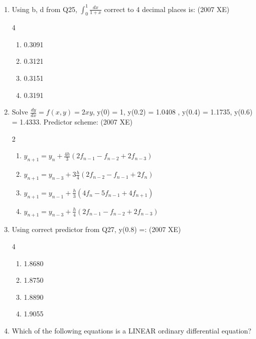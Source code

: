 \begin{enumerate}[label=\thesubsection.\arabic*,ref=\thesubsection.\theenumi]
    \item Using b, d  from Q25, $\int_0^1 \frac{dx}{1+x}$ correct to 4 decimal places is:
    \hfill{(2007 XE)}
    \begin{multicols}{4}
    \begin{enumerate}
        \item 0.3091
        \item 0.3121
        \item 0.3151
        \item 0.3191
    \end{enumerate}
\end{multicols}


    \item Solve $\frac{dy}{dx} = f(x,y) = 2xy$, y(0) = 1, y(0.2) = 1.0408 , y(0.4) = 1.1735, y(0.6) = 1.4333. Predictor scheme:
    \hfill{(2007 XE)}
    \begin{multicols}{2}
    \begin{enumerate}
        \item $y_{n+1} = y_n + \frac{4h}{3} (2f_{n-1} - f_{n-2} + 2f_{n-3})$\\
     
        \item $y_{n+1} = y_{n-3} + 3\frac{h}{4} (2f_{n-2} - f_{n-1} + 2f_n)$\\
      
        \item $y_{n+1} = y_{n-1} + \frac{h}{3} (4f_n - 5f_{n-1} + 4f_{n+1}) $\\
        
        \item $y_{n+1} = y_{n-3} + \frac{h}{4} (2f_{n-1} - f_{n-2} + 2f_{n-3})$\\
    \end{enumerate}
\end{multicols}

    \item Using correct predictor from Q27, y(0.8) =:
    \hfill{(2007 XE)}
    \begin{multicols}{4}
    \begin{enumerate}
        \item 1.8680
        \item 1.8750
        \item 1.8890
        \item 1.9055
    \end{enumerate}
\end{multicols}
\item Which of the following equations is a LINEAR ordinary differential equation?


\end{enumerate}
